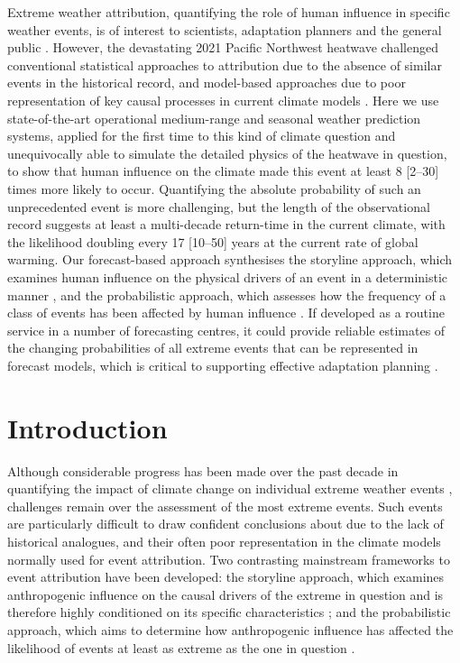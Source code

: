   Extreme weather attribution, quantifying the role of human influence in specific weather events, is of interest to scientists, adaptation planners and the general public \cite{national_academies_of_sciences_engineering_and_medicine_attribution_2016}. However, the devastating 2021 Pacific Northwest heatwave challenged conventional statistical approaches to attribution due to the absence of similar events in the historical record, and model-based approaches due to poor representation of key causal processes in current climate models \cite{white_unprecedented_2022}. Here we use state-of-the-art operational medium-range and seasonal weather prediction systems, applied for the first time to this kind of climate question and unequivocally able to simulate the detailed physics of the heatwave in question, to show that human influence on the climate made this event at least 8 [2--30] times more likely to occur. Quantifying the absolute probability of such an unprecedented event is more challenging, but the length of the observational record suggests at least a multi-decade return-time in the current climate, with the likelihood doubling every 17 [10--50] years at the current rate of global warming. Our forecast-based approach synthesises the storyline approach, which examines human influence on the physical drivers of an event in a deterministic manner \cite{shepherd_common_2016}, and the probabilistic approach, which assesses how the frequency of a class of events has been affected by human influence \cite{stott_human_2004}. If developed as a routine service in a number of forecasting centres, it could provide reliable estimates of the changing probabilities of all extreme events that can be represented in forecast models, which is critical to supporting effective adaptation planning \cite{harrington_integrating_2022,mitchell_climate_2021}.

\section{Introduction}\label{ch4:intro}

  Although considerable progress has been made over the past decade in quantifying the impact of climate change on individual extreme weather events \cite{stott_human_2004,national_academies_of_sciences_engineering_and_medicine_attribution_2016}, challenges remain over the assessment of the most extreme events. Such events are particularly difficult to draw confident conclusions about due to the lack of historical analogues, and their often poor representation in the climate models normally used for event attribution. Two contrasting mainstream frameworks to event attribution have been developed: the storyline approach, which examines anthropogenic influence on the causal drivers of the extreme in question and is therefore highly conditioned on its specific characteristics \cite{trenberth_attribution_2015,shepherd_common_2016,hoerling_anatomy_2013}; and the probabilistic approach, which aims to determine how anthropogenic influence has affected the likelihood of events at least as extreme as the one in question \cite{philip_protocol_2020,pall_anthropogenic_2011}. 

